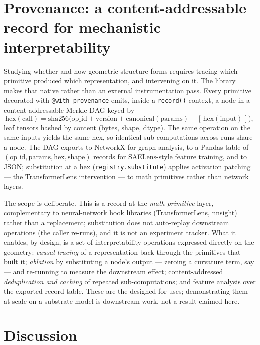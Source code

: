 \documentclass{article}
\newcommand{\code}[1]{\texttt{#1}}
\begin{document}
\section{Provenance: a content-addressable record for mechanistic interpretability}
\label{sec:provenance}

Studying whether and how geometric structure forms requires tracing which
primitive produced which representation, and intervening on it. The
library makes that native rather than an external instrumentation pass.
Every primitive decorated with \code{@with\_provenance} emits, inside a
\code{record()} context, a node in a content-addressable Merkle DAG keyed
by
\[
  \mathrm{hex}(\text{call}) = \mathrm{sha256}\big(\text{op\_id}
  + \text{version} + \mathrm{canonical}(\text{params})
  + [\,\mathrm{hex}(\text{input})\,]\big),
\]
leaf tensors hashed by content (bytes, shape, dtype). The same operation
on the same inputs yields the same hex, so identical sub-computations
across runs share a node. The DAG exports to NetworkX for graph
analysis, to a Pandas table of $(\text{op\_id}, \text{params},
\text{hex}, \text{shape})$ records for \mbox{SAELens}-style feature
training, and to JSON; substitution at a hex (\code{registry.substitute})
applies activation patching --- the TransformerLens intervention --- to
math primitives rather than network layers.

The scope is deliberate. This is a record at the \emph{math-primitive}
layer, complementary to neural-network hook libraries (TransformerLens,
nnsight) rather than a replacement; substitution does not auto-replay
downstream operations (the caller re-runs), and it is not an experiment
tracker. What it enables, by design, is a set of interpretability
operations expressed directly on the geometry: \emph{causal tracing} of a
representation back through the primitives that built it; \emph{ablation}
by substituting a node's output --- zeroing a curvature term, say --- and
re-running to measure the downstream effect; content-addressed
\emph{deduplication and caching} of repeated sub-computations; and
feature analysis over the exported record table. These are the
designed-for uses; demonstrating them at scale on a substrate model is
downstream work, not a result claimed here.

\section{Discussion}
\label{sec:discussion}
\end{document}
